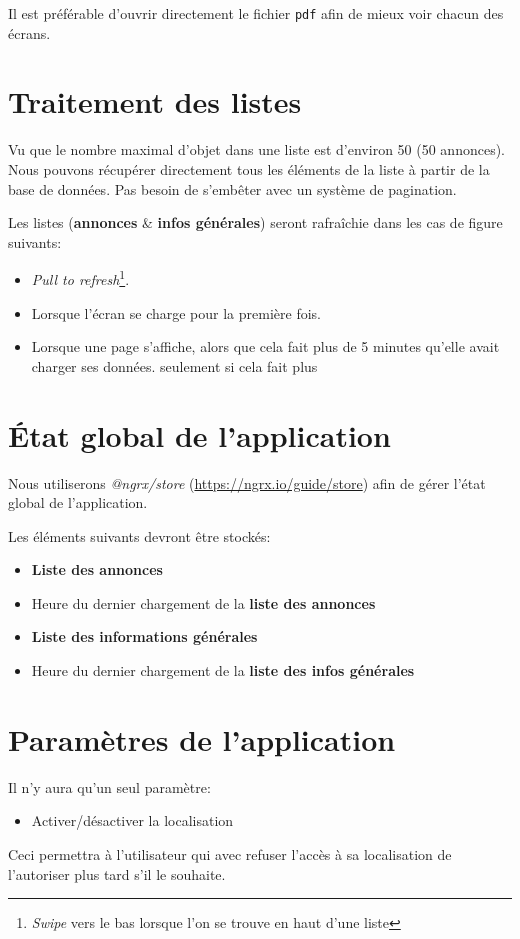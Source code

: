 \documentclass[french]{report}
\begin{document}
Il est préférable d'ouvrir directement le fichier \verb|pdf| afin de mieux voir
chacun des écrans.

\section{Traitement des listes}
Vu que le nombre maximal d'objet dans une liste est d'environ 50 (50 annonces).
Nous pouvons récupérer directement tous les éléments de la liste à partir de la base
de données. Pas besoin de s'embêter avec un système de pagination.

Les listes (\textbf{annonces} \& \textbf{infos générales}) seront rafraîchie dans 
les cas de figure suivants:
\begin{itemize}
    \item \textit{Pull to refresh}\footnote{\textit{Swipe} vers le bas lorsque l'on
    se trouve en haut d'une liste}.
    \item Lorsque l'écran se charge pour la première fois.
    \item Lorsque une page s'affiche, alors que cela fait plus de 5 minutes qu'elle
    avait charger ses données.
    seulement si cela fait plus 
\end{itemize}

\section{État global de l'application}
Nous utiliserons \textit{@ngrx/store} (\url{https://ngrx.io/guide/store}) afin de 
gérer l'état global de l'application.

Les éléments suivants devront être stockés:
\begin{itemize}
    \item \textbf{Liste des annonces}
    \item Heure du dernier chargement de la \textbf{liste des annonces}
    \item \textbf{Liste des informations générales}
    \item Heure du dernier chargement de la \textbf{liste des infos générales}
\end{itemize}

\section{Paramètres de l'application}
Il n'y aura qu'un seul paramètre:
\begin{itemize}
    \item Activer/désactiver la localisation
\end{itemize}
Ceci permettra à l'utilisateur qui avec refuser l'accès à sa localisation de
l'autoriser plus tard s'il le souhaite.
\end{document}
